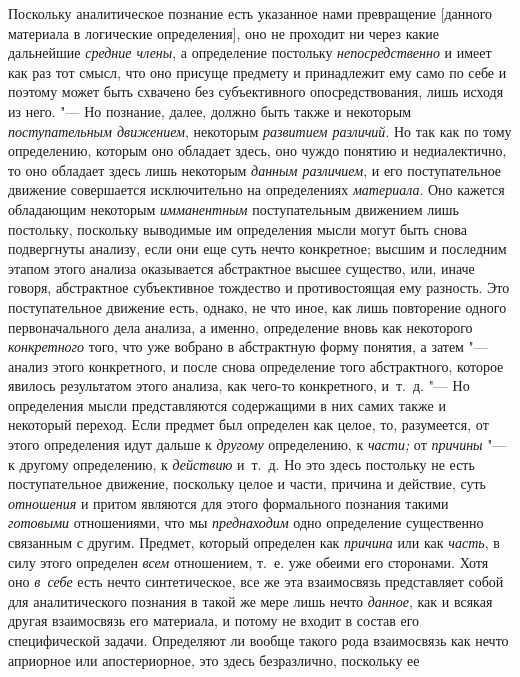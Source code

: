 Поскольку аналитическое познание есть указанное нами
превращение [данного материала в логические определения], оно не проходит
ни через какие дальнейшие {\em средние
члены}, а определение постольку
{\em непосредственно} и
имеет как раз тот смысл, что оно присуще предмету и принадлежит ему само по
себе и поэтому может быть схвачено без субъективного опосредствования, лишь
исходя из него. "--- Но познание, далее, должно быть также и
некоторым {\em поступательным
движением}, некоторым
{\em развитием различий}.
Но так как по тому определению, которым оно обладает здесь,
оно чуждо понятию и недиалектично, то оно обладает здесь лишь некоторым
{\em данным различием}, и
его поступательное движение совершается исключительно на определениях
{\em материала}. Оно
кажется обладающим некоторым
{\em имманентным}
поступательным движением лишь постольку, поскольку выводимые
им определения мысли могут быть снова подвергнуты анализу, если они еще
суть нечто конкретное; высшим и последним этапом этого анализа оказывается
абстрактное высшее существо, или, иначе говоря, абстрактное субъективное
тождество и противостоящая ему разность. Это поступательное движение есть,
однако, не что иное, как лишь повторение одного первоначального дела
анализа, а именно, определение вновь как некоторого
{\em конкретного} того,
что уже вобрано в абстрактную форму понятия, а затем
"--- анализ этого конкретного, и после снова определение того
абстрактного, которое явилось результатом этого анализа, как чего-то
конкретного, и~т.~д. "--- Но определения мысли
представляются содержащими в них самих также и некоторый
переход. Если предмет был определен как целое, то, разумеется, от этого
определения идут дальше к {\em другому}
определению, к
{\em части;} от
{\em причины} "--- к другому
определению, к {\em действию}
и~т.~д. Но это здесь постольку не есть поступательное
движение, поскольку целое и части, причина и действие, суть
{\em отношения} и притом
являются для этого формального познания такими
{\em готовыми}
отношениями, что мы
{\em преднаходим} одно
определение существенно связанным с другим. Предмет, который определен как
{\em причина} или как
{\em часть}, в силу этого
определен {\em всем}
отношением, т.~е. уже обеими его сторонами. Хотя оно
{\em в~себе} есть нечто
синтетическое, все же эта взаимосвязь представляет собой для аналитического
познания в такой же мере лишь нечто
{\em данное}, как и
всякая другая взаимосвязь его материала, и потому не входит в состав его
специфической задачи. Определяют ли вообще такого рода взаимосвязь как
нечто априорное или апостериорное, это здесь безразлично, поскольку ее
